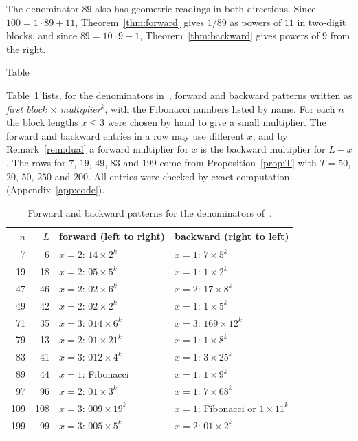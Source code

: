 \documentclass[11pt,a4paper]{amsart}
\makeatletter
\def\section{\@startsection{section}{1}%
  \z@{-.7\linespacing\@plus-\linespacing}{.5\linespacing}%
  {\normalfont\scshape\centering}}
\theoremstyle{definition}
\theoremstyle{remark}
\makeatother
\begin{document}
The denominator $89$ also has geometric readings in both directions. Since
$100 = 1\cdot 89 + 11$, Theorem~\ref{thm:forward} gives $1/89$ as powers of $11$
in two-digit blocks, and since $89 = 10\cdot 9 - 1$, Theorem~\ref{thm:backward}
gives powers of $9$ from the right.

\section{Table}

Table~\ref{tab:patterns} lists, for the denominators in~\cite{mse1365506},
forward and backward patterns written as \emph{first block} $\times$
\emph{multiplier}$^k$, with the Fibonacci numbers listed by name. For each $n$
the block lengths $x \le 3$ were chosen by hand to give a small multiplier. The
forward and backward entries in a row may use different $x$, and by
Remark~\ref{rem:dual} a forward multiplier for $x$ is the backward multiplier
for $L - x$. The rows for $7$, $19$, $49$, $83$ and $199$ come from
Proposition~\ref{prop:T} with $T = 50$, $20$, $50$, $250$ and $200$. All
entries were checked by exact computation (Appendix~\ref{app:code}).

\begin{table}[ht]
\centering
\begin{tabular}{rrll}
\toprule
$n$ & $L$ & forward (left to right) & backward (right to left) \\
\midrule
7   & 6   & $x=2$: $14\times 2^k$   & $x=1$: $7\times 5^k$ \\
19  & 18  & $x=2$: $05\times 5^k$   & $x=1$: $1\times 2^k$ \\
47  & 46  & $x=2$: $02\times 6^k$   & $x=2$: $17\times 8^k$ \\
49  & 42  & $x=2$: $02\times 2^k$   & $x=1$: $1\times 5^k$ \\
71  & 35  & $x=3$: $014\times 6^k$  & $x=3$: $169\times 12^k$ \\
79  & 13  & $x=2$: $01\times 21^k$  & $x=1$: $1\times 8^k$ \\
83  & 41  & $x=3$: $012\times 4^k$  & $x=1$: $3\times 25^k$ \\
89  & 44  & $x=1$: Fibonacci        & $x=1$: $1\times 9^k$ \\
97  & 96  & $x=2$: $01\times 3^k$   & $x=1$: $7\times 68^k$ \\
109 & 108 & $x=3$: $009\times 19^k$ & $x=1$: Fibonacci or $1\times 11^k$ \\
199 & 99  & $x=3$: $005\times 5^k$  & $x=2$: $01\times 2^k$ \\
\bottomrule
\end{tabular}

\vspace{8pt}
\caption{Forward and backward patterns for the denominators of~\cite{mse1365506}.}
\label{tab:patterns}
\end{table}
\end{document}
